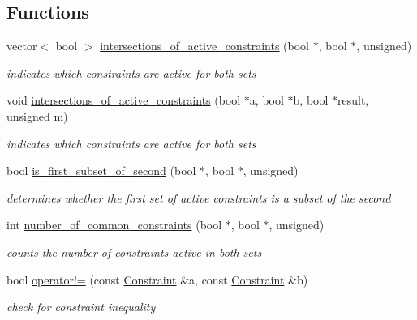 \subsection*{Functions}
\begin{DoxyCompactItemize}
\item 
vector$<$ bool $>$ \hyperlink{group___c_l_s_solvers_gaf3434d5c281c16ef7a09d8f73445ea00}{intersections\+\_\+of\+\_\+active\+\_\+constraints} (bool $\ast$, bool $\ast$, unsigned)
\begin{DoxyCompactList}\small\item\em indicates which constraints are active for both sets \end{DoxyCompactList}\item 
void \hyperlink{group___c_l_s_solvers_ga1f87ac127ced7d681b3e51e38eef0cf4}{intersections\+\_\+of\+\_\+active\+\_\+constraints} (bool $\ast$a, bool $\ast$b, bool $\ast$result, unsigned m)
\begin{DoxyCompactList}\small\item\em indicates which constraints are active for both sets \end{DoxyCompactList}\item 
bool \hyperlink{group___c_l_s_solvers_ga0a997634a9b11bec9c54d0243ac29008}{is\+\_\+first\+\_\+subset\+\_\+of\+\_\+second} (bool $\ast$, bool $\ast$, unsigned)
\begin{DoxyCompactList}\small\item\em determines whether the first set of active constraints is a subset of the second \end{DoxyCompactList}\item 
int \hyperlink{group___c_l_s_solvers_gad030de457424bef601e2903eb619926e}{number\+\_\+of\+\_\+common\+\_\+constraints} (bool $\ast$, bool $\ast$, unsigned)
\begin{DoxyCompactList}\small\item\em counts the number of constraints active in both sets \end{DoxyCompactList}\item 
bool \hyperlink{namespace_l_p___solvers_a49c6d0c3337c5bc3379a273ec332ba5c}{operator!=} (const \hyperlink{group___c_l_s_solvers_class_l_p___solvers_1_1_constraint}{Constraint} \&a, const \hyperlink{group___c_l_s_solvers_class_l_p___solvers_1_1_constraint}{Constraint} \&b)
\begin{DoxyCompactList}\small\item\em check for constraint inequality \end{DoxyCompactList}\item 

\end{DoxyCompactItemize}
